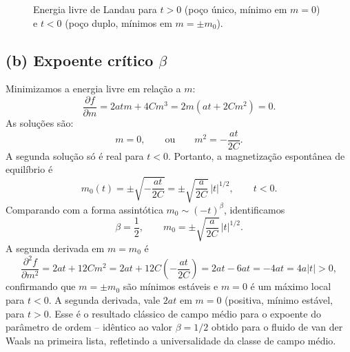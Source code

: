 \documentclass[11pt,a4paper]{article}
\begin{document}
\begin{figure}[h]
\centering
{}
\hfill
{}
\caption{Energia livre de Landau para $t > 0$ (poço único, mínimo em $m=0$) e $t < 0$ (poço duplo, mínimos em $m = \pm m_0$).}
\label{fig:landau_f}
\end{figure}
%
\subsection*{(b) Expoente crítico $\beta$}
%
Minimizamos a energia livre em relação a $m$:
%
\begin{equation}
    \frac{\partial f}{\partial m} = 2a t m + 4 C m^3 = 2m (a t + 2 C m^2) = 0.
\end{equation}
%
As soluções são:
%
\begin{equation}
    m = 0, \qquad \text{ou} \qquad m^2 = -\frac{a t}{2C}.
\end{equation}
%
A segunda solução só é real para $t < 0$. Portanto, a magnetização espontânea de equilíbrio é
%
\begin{equation}
    m_0(t) = \pm \sqrt{-\frac{a t}{2C}} = \pm \sqrt{\frac{a}{2C}} \, |t|^{1/2}, \qquad t < 0.
\end{equation}
%
Comparando com a forma assintótica $m_0 \sim (-t)^\beta$, identificamos
%
\begin{equation}
    \boxed{\beta = \frac{1}{2}, \qquad m_0 = \pm \sqrt{\frac{a}{2C}} \, |t|^{1/2}}.
\end{equation}
%
A segunda derivada em $m = m_0$ é
%
\begin{equation}
    \frac{\partial^2 f}{\partial m^2} = 2a t + 12 C m^2 = 2a t + 12 C \left( -\frac{a t}{2C} \right) = 2a t - 6a t = -4a t = 4a |t| > 0,
\end{equation}
%
confirmando que $m = \pm m_0$ são mínimos estáveis e $m=0$ é um máximo local para $t<0$. A segunda derivada, vale $2at$ em $m=0$ (positiva, mínimo estável, para $t>0$. Esse é o resultado clássico de campo médio para o expoente do parâmetro de ordem -- idêntico ao valor $\beta=1/2$ obtido para o fluido de van der Waals na primeira lista, refletindo a universalidade da classe de campo médio.
%
\end{document}
